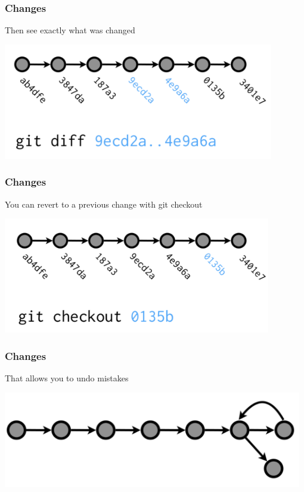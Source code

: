   \begin{frame}[t]
    \frametitle{Changes}
    Then see exactly what was changed 
    \begin{center}
      \includegraphics[height=2.00in]{./images/from-wickham-04} 
    \end{center} 
  \end{frame}

  \begin{frame}[t]
    \frametitle{Changes}
    You can revert to a previous change with git checkout
    \begin{center}
      \includegraphics[height=2.00in]{./images/from-wickham-05} 
    \end{center} 
  \end{frame}

  \begin{frame}[t]
    \frametitle{Changes}
    That allows you to undo mistakes
    \begin{center}
      \includegraphics[width=0.98\textwidth]{./images/from-wickham-06} 
    \end{center} 
  \end{frame}
